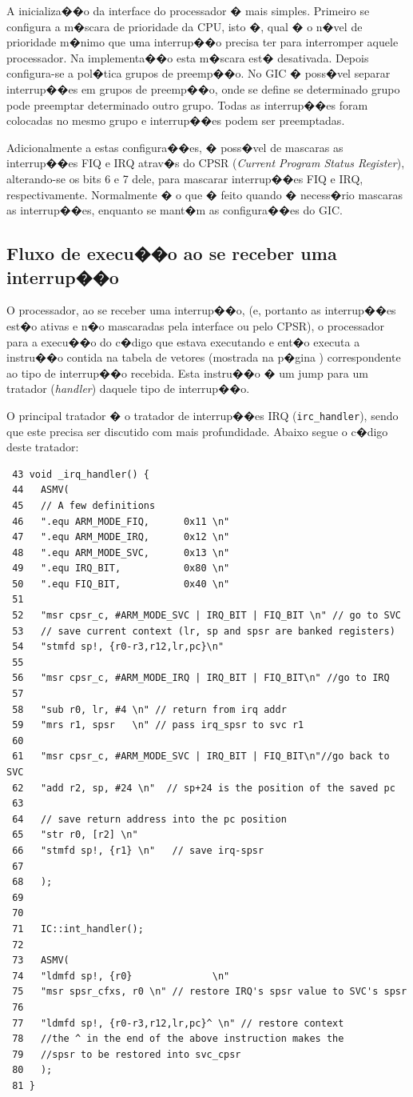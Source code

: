 \documentclass{ufscThesis/ufscThesis} %
\begin{document}
A inicializa��o da interface do processador � mais simples. Primeiro se configura a m�scara de prioridade da CPU, isto �, qual � o n�vel de prioridade m�nimo que uma interrup��o precisa ter para interromper aquele processador. Na implementa��o esta m�scara est� desativada. Depois configura-se a pol�tica grupos de preemp��o. No GIC � poss�vel separar interrup��es em grupos de preemp��o, onde se define se determinado grupo pode preemptar determinado outro grupo. Todas as interrup��es foram colocadas no mesmo grupo e interrup��es podem ser preemptadas.

Adicionalmente a estas configura��es, � poss�vel de mascaras as interrup��es FIQ e IRQ atrav�s do CPSR (\emph{Current Program Status Register}), alterando-se os bits 6 e 7 dele, para mascarar interrup��es FIQ e IRQ, respectivamente. Normalmente � o que � feito quando � necess�rio mascaras as interrup��es, enquanto se mant�m as configura��es do GIC.

\subsection{Fluxo de execu��o ao se receber uma interrup��o}

O processador, ao se receber uma interrup��o, (e, portanto as interrup��es est�o ativas e n�o mascaradas pela interface ou pelo CPSR), o processador para a execu��o do c�digo que estava executando e ent�o executa a instru��o contida na tabela de vetores (mostrada na p�gina \pageref) correspondente ao tipo de interrup��o recebida. Esta instru��o � um jump para um tratador (\emph{handler}) daquele tipo de interrup��o.

O principal tratador � o tratador de interrup��es IRQ (\verb+irc_handler+), sendo que este precisa ser discutido com mais profundidade. Abaixo segue o c�digo deste tratador:

\begin{verbatim}
 43 void _irq_handler() {
 44   ASMV(
 45   // A few definitions
 46   ".equ ARM_MODE_FIQ,      0x11 \n"
 47   ".equ ARM_MODE_IRQ,      0x12 \n"
 48   ".equ ARM_MODE_SVC,      0x13 \n"
 49   ".equ IRQ_BIT,           0x80 \n"
 50   ".equ FIQ_BIT,           0x40 \n"
 51 
 52   "msr cpsr_c, #ARM_MODE_SVC | IRQ_BIT | FIQ_BIT \n" // go to SVC
 53   // save current context (lr, sp and spsr are banked registers)
 54   "stmfd sp!, {r0-r3,r12,lr,pc}\n"
 55 
 56   "msr cpsr_c, #ARM_MODE_IRQ | IRQ_BIT | FIQ_BIT\n" //go to IRQ
 57 
 58   "sub r0, lr, #4 \n" // return from irq addr
 59   "mrs r1, spsr   \n" // pass irq_spsr to svc r1
 60 
 61   "msr cpsr_c, #ARM_MODE_SVC | IRQ_BIT | FIQ_BIT\n"//go back to SVC
 62   "add r2, sp, #24 \n"  // sp+24 is the position of the saved pc
 63   
 64   // save return address into the pc position
 65   "str r0, [r2] \n" 
 66   "stmfd sp!, {r1} \n"   // save irq-spsr
 67       
 68   );    
 69   
 70     
 71   IC::int_handler();
 72     
 73   ASMV(        
 74   "ldmfd sp!, {r0}              \n"
 75   "msr spsr_cfxs, r0 \n" // restore IRQ's spsr value to SVC's spsr
 76             
 77   "ldmfd sp!, {r0-r3,r12,lr,pc}^ \n" // restore context
 78   //the ^ in the end of the above instruction makes the 
 79   //spsr to be restored into svc_cpsr
 80   );
 81 }
\end{verbatim}
\end{document}
